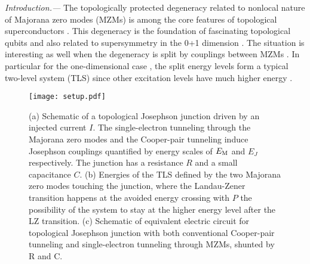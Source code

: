 \documentclass[aps,prl,twocolumn,showpacs,showpacs,10pt,superscriptaddress]{revtex4-1}
\begin{document}
{\it Introduction.---}
The topologically protected degeneracy related to nonlocal nature of Majorana zero modes (MZMs) is among the core features of topological superconductors \cite{kitaev01,kitaevaip,zhangrmp}. This degeneracy is the foundation of fascinating topological qubits \cite{fu08,sato09,Tanaka09,sauprl10,alicea12,beenakker13,franzrmp,aliceaprx,aguadoreview} and also related to supersymmetry in the 0+1 dimension \cite{Qi09,Hsieh16,Huang17}. The situation is interesting as well when the degeneracy is split by couplings between MZMs \cite{beenakker08, Cheng09, Muzushima10,tewarijpcm,marcus16}. In particular for the one-dimensional case \cite{fuprb09,Lutchyn10,oregprl10,Mourik12,Deng12}, the split energy levels form a typical two-level system (TLS) since other excitation levels have much higher energy \cite{alicea12,Platero12,aguado11}.

\begin{figure}
\begin{center}
\texttt{[image: setup.pdf]}
\caption{(a) Schematic of a topological Josephson junction driven by an injected current $I$. The single-electron tunneling through the Majorana zero modes and the Cooper-pair tunneling induce Josephson couplings quantified by energy scales of $E_{\rm M}$ and $E_J$ respectively. The junction has a resistance $R$ and a small capacitance $C$. (b) Energies of the TLS defined by the two Majorana zero modes touching the junction, where the Landau-Zener transition happens at the avoided energy crossing with $P$ the possibility of the system to stay at the higher energy level after the LZ transition. (c) Schematic of equivalent electric circuit for topological Josephson junction with both conventional Cooper-pair tunneling and single-electron tunneling through MZMs, shunted by R and C.}
\label{fig:setup}
\end{center}
\end{figure}
\end{document}
